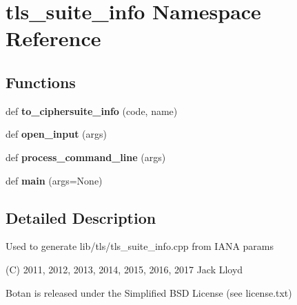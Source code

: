 \hypertarget{namespacetls__suite__info}{}\section{tls\+\_\+suite\+\_\+info Namespace Reference}
\label{namespacetls__suite__info}
\subsection*{Functions}
\begin{DoxyCompactItemize}
\item 
\mbox{\label{namespacetls__suite__info_a2e6fbcc1ec3aa4dac5b5fd73e302d2c3}} 
def {\bfseries to\+\_\+ciphersuite\+\_\+info} (code, name)
\item 
\mbox{\label{namespacetls__suite__info_ad89023533ce403eff5c604d10bcb6aaa}} 
def {\bfseries open\+\_\+input} (args)
\item 
\mbox{\label{namespacetls__suite__info_aa3b8e64c600a88f6a30a7fff6c8610e1}} 
def {\bfseries process\+\_\+command\+\_\+line} (args)
\item 
\mbox{\label{namespacetls__suite__info_a38685c0dab7928bfe7a1c1ebd404c963}} 
def {\bfseries main} (args=None)
\end{DoxyCompactItemize}


\subsection{Detailed Description}
\begin{DoxyVerb}Used to generate lib/tls/tls_suite_info.cpp from IANA params

(C) 2011, 2012, 2013, 2014, 2015, 2016, 2017 Jack Lloyd

Botan is released under the Simplified BSD License (see license.txt)
\end{DoxyVerb}
 